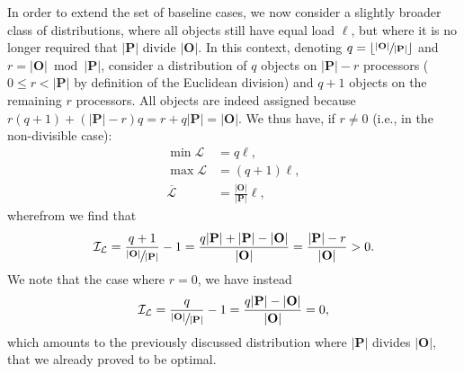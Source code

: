 In order to extend the set of baseline cases, we now consider a
slightly broader class of distributions, where all 
objects still have equal load $\ell$, but where it is no longer
required that $\vert\mathbf{P}\vert$ divide $\vert\mathbf{O}\vert$.
In this context, denoting
$q=\lfloor\sfrac{\vert\mathbf{O}\vert}{\vert\mathbf{P}\vert}\rfloor$
and $r=\vert\mathbf{O}\vert\bmod\vert\mathbf{P}\vert$, consider a
distribution of $q$ objects on $\vert\mathbf{P}\vert-r$ processors 
($0\le{r}<\vert\mathbf{P}\vert$ by definition of the Euclidean
division) and $q+1$ objects on the remaining $r$
processors. All objects are indeed assigned because
$r(q+1)+(\vert\mathbf{P}\vert-r)q=r+q\vert\mathbf{P}\vert=\vert\mathbf{O}\vert$.
We thus have, if $r\neq0$ (i.e., in the non-divisible case):
\begin{align*}
\min{\mathcal{L}}
&= q\ell,\\
\max{\mathcal{L}}
&= (q+1)\ell,\\
\overline{\mathcal{L}}
&= \frac{\vert\mathbf{O}\vert}{\vert\mathbf{P}\vert}\ell,
\end{align*}
wherefrom we find that
\[
\mathcal{I}_{\mathcal{L}} =
\frac{q+1}
{\sfrac{\vert\mathbf{O}\vert}{\vert\mathbf{P}\vert}} - 1
=
\frac{q\vert\mathbf{P}\vert + \vert\mathbf{P}\vert
- \vert\mathbf{O}\vert}{\vert\mathbf{O}\vert}
=
\frac{\vert\mathbf{P}\vert - r}{\vert\mathbf{O}\vert}
> 0.
\]
We note that the case where $r=0$, we have instead
\[
\mathcal{I}_{\mathcal{L}} =
\frac{q}
{\sfrac{\vert\mathbf{O}\vert}{\vert\mathbf{P}\vert}} - 1
=
\frac{q\vert\mathbf{P}\vert - \vert\mathbf{O}\vert}
{\vert\mathbf{O}\vert}
= 0,
\]
which amounts to the previously discussed distribution where
$\vert\mathbf{P}\vert$ divides $\vert\mathbf{O}\vert$, that we already
proved to be optimal.


